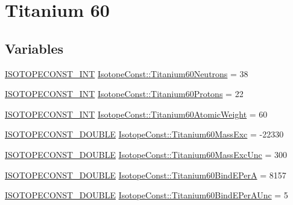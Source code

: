 \hypertarget{group___isotope_const-_titanium-_ti60}{}\section{Titanium 60}
\label{group___isotope_const-_titanium-_ti60}
\subsection*{Variables}
\begin{DoxyCompactItemize}
\item 
\mbox{\hyperlink{group___isotope_const-_macros_ga5f18360b3e99483a35c32d789e62621c}{I\+S\+O\+T\+O\+P\+E\+C\+O\+N\+S\+T\+\_\+\+I\+NT}} \mbox{\hyperlink{group___isotope_const-_titanium-_ti60_gaaca5084dd865e04dcb7c35b34205d5a7}{Isotope\+Const\+::\+Titanium60\+Neutrons}} = 38
\item 
\mbox{\hyperlink{group___isotope_const-_macros_ga5f18360b3e99483a35c32d789e62621c}{I\+S\+O\+T\+O\+P\+E\+C\+O\+N\+S\+T\+\_\+\+I\+NT}} \mbox{\hyperlink{group___isotope_const-_titanium-_ti60_ga7e1e90275e3caa054eacc8a5045c3d35}{Isotope\+Const\+::\+Titanium60\+Protons}} = 22
\item 
\mbox{\hyperlink{group___isotope_const-_macros_ga5f18360b3e99483a35c32d789e62621c}{I\+S\+O\+T\+O\+P\+E\+C\+O\+N\+S\+T\+\_\+\+I\+NT}} \mbox{\hyperlink{group___isotope_const-_titanium-_ti60_ga21fc3ea99c664aaa67be37570ec3552f}{Isotope\+Const\+::\+Titanium60\+Atomic\+Weight}} = 60
\item 
\mbox{\hyperlink{group___isotope_const-_macros_ga8f45a7272ce02c0b4c65c44636ed719a}{I\+S\+O\+T\+O\+P\+E\+C\+O\+N\+S\+T\+\_\+\+D\+O\+U\+B\+LE}} \mbox{\hyperlink{group___isotope_const-_titanium-_ti60_ga45d332f9e6dccb91611e66ee8d34ff87}{Isotope\+Const\+::\+Titanium60\+Mass\+Exc}} = -\/22330
\item 
\mbox{\hyperlink{group___isotope_const-_macros_ga8f45a7272ce02c0b4c65c44636ed719a}{I\+S\+O\+T\+O\+P\+E\+C\+O\+N\+S\+T\+\_\+\+D\+O\+U\+B\+LE}} \mbox{\hyperlink{group___isotope_const-_titanium-_ti60_ga9fed32165e86d8d64e4fe741c67272ba}{Isotope\+Const\+::\+Titanium60\+Mass\+Exc\+Unc}} = 300
\item 
\mbox{\hyperlink{group___isotope_const-_macros_ga8f45a7272ce02c0b4c65c44636ed719a}{I\+S\+O\+T\+O\+P\+E\+C\+O\+N\+S\+T\+\_\+\+D\+O\+U\+B\+LE}} \mbox{\hyperlink{group___isotope_const-_titanium-_ti60_ga00d70b679346c25f81dc61396984ed97}{Isotope\+Const\+::\+Titanium60\+Bind\+E\+PerA}} = 8157
\item 
\mbox{\hyperlink{group___isotope_const-_macros_ga8f45a7272ce02c0b4c65c44636ed719a}{I\+S\+O\+T\+O\+P\+E\+C\+O\+N\+S\+T\+\_\+\+D\+O\+U\+B\+LE}} \mbox{\hyperlink{group___isotope_const-_titanium-_ti60_gaffe2a45e706a46abc7817f87243305fb}{Isotope\+Const\+::\+Titanium60\+Bind\+E\+Per\+A\+Unc}} = 5

\end{DoxyCompactItemize}
